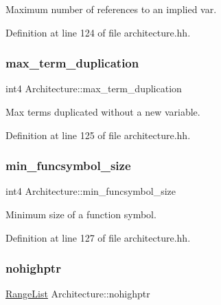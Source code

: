 Maximum number of references to an implied var. 



Definition at line 124 of file architecture.\+hh.

\mbox{\label{class_architecture_a99db0ca5ac8e5c9edfa7515f97b2ab5a}} 
\subsubsection{\texorpdfstring{max\_term\_duplication}{max\_term\_duplication}}
{\footnotesize\ttfamily int4 Architecture\+::max\+\_\+term\+\_\+duplication}



Max terms duplicated without a new variable. 



Definition at line 125 of file architecture.\+hh.

\mbox{\label{class_architecture_aa5c79b6eca1b3c98884bb53c90bf417d}} 
\subsubsection{\texorpdfstring{min\_funcsymbol\_size}{min\_funcsymbol\_size}}
{\footnotesize\ttfamily int4 Architecture\+::min\+\_\+funcsymbol\+\_\+size}



Minimum size of a function symbol. 



Definition at line 127 of file architecture.\+hh.

\mbox{\label{class_architecture_a693da460aeb788e4fbaf3361bd07756a}} 
\subsubsection{\texorpdfstring{nohighptr}{nohighptr}}
{\footnotesize\ttfamily \mbox{\hyperlink{class_range_list}{Range\+List}} Architecture\+::nohighptr}



